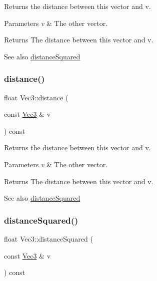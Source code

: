 Returns the distance between this vector and v.


\begin{DoxyParams}{Parameters}
{\em v} & The other vector.\\
\hline
\end{DoxyParams}
\begin{DoxyReturn}{Returns}
The distance between this vector and v.
\end{DoxyReturn}
\begin{DoxySeeAlso}{See also}
\hyperlink{classVec3_acc8f986cd9f852f7872c10d26c651e2e}{distance\+Squared} 
\end{DoxySeeAlso}
\mbox{\label{classVec3_ae63145f5152b7453d9f2047ccca8b89f}} 
\subsubsection{\texorpdfstring{distance()}{distance()}\hspace{0.1cm}{\footnotesize\ttfamily [2/2]}}
{\footnotesize\ttfamily float Vec3\+::distance (\begin{DoxyParamCaption}\item[{const \hyperlink{classVec3}{Vec3} \&}]{v }\end{DoxyParamCaption}) const}

Returns the distance between this vector and v.


\begin{DoxyParams}{Parameters}
{\em v} & The other vector.\\
\hline
\end{DoxyParams}
\begin{DoxyReturn}{Returns}
The distance between this vector and v.
\end{DoxyReturn}
\begin{DoxySeeAlso}{See also}
\hyperlink{classVec3_acc8f986cd9f852f7872c10d26c651e2e}{distance\+Squared} 
\end{DoxySeeAlso}
\mbox{\label{classVec3_acc8f986cd9f852f7872c10d26c651e2e}} 
\subsubsection{\texorpdfstring{distance\+Squared()}{distanceSquared()}\hspace{0.1cm}{\footnotesize\ttfamily [1/2]}}
{\footnotesize\ttfamily float Vec3\+::distance\+Squared (\begin{DoxyParamCaption}\item[{const \hyperlink{classVec3}{Vec3} \&}]{v }\end{DoxyParamCaption}) const}

